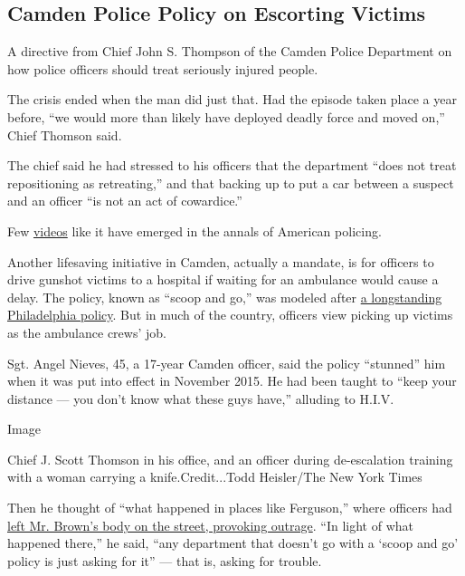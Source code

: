 \hypertarget{camden-police-policy-on-escorting-victims}{%
\subsection{Camden Police Policy on Escorting
Victims}\label{camden-police-policy-on-escorting-victims}}

A directive from Chief John S. Thompson of the Camden Police Department
on how police officers should treat seriously injured people.

The crisis ended when the man did just that. Had the episode taken place
a year before, ``we would more than likely have deployed deadly force
and moved on,'' Chief Thomson said.

The chief said he had stressed to his officers that the department
``does not treat repositioning as retreating,'' and that backing up to
put a car between a suspect and an officer ``is not an act of
cowardice.''

Few
\href{https://www.youtube.com/watch?v=YtVUMT9P8iw\&feature=youtu.be}{videos}
like it have emerged in the annals of American policing.

Another lifesaving initiative in Camden, actually a mandate, is for
officers to drive gunshot victims to a hospital if waiting for an
ambulance would cause a delay. The policy, known as ``scoop and go,''
was modeled after
\href{https://news.upenn.edu/news/survival-rates-similar-gunshot-stabbing-victims-whether-brought-hospital-police-or-ems-penn-med}{a
longstanding Philadelphia policy}. But in much of the country, officers
view picking up victims as the ambulance crews' job.

Sgt. Angel Nieves, 45, a 17-year Camden officer, said the policy
``stunned'' him when it was put into effect in November 2015. He had
been taught to ``keep your distance --- you don't know what these guys
have,'' alluding to H.I.V.

Image

Chief J. Scott Thomson in his office, and an officer during
de-escalation training with a woman carrying a knife.Credit...Todd
Heisler/The New York Times

Then he thought of ``what happened in places like Ferguson,'' where
officers had
\href{https://www.nytimes3xbfgragh.onion/2014/08/24/us/michael-brown-a-bodys-timeline-4-hours-on-a-ferguson-street.html?_r=0}{left
Mr. Brown's body on the street, provoking outrage}. ``In light of what
happened there,'' he said, ``any department that doesn't go with a
`scoop and go' policy is just asking for it'' --- that is, asking for
trouble.

